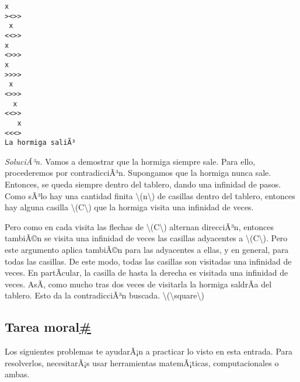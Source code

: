 \documentclass[
]{article}
\begin{document}
\begin{verbatim}
x   
><>>
 x  
<<>>
x   
<>>>
x   
>>>>
 x  
<>>>
  x 
<<>>
   x
<<<>
La hormiga saliÃ³
\end{verbatim}

\emph{SoluciÃ³n.} Vamos a demostrar que la hormiga siempre sale. Para
ello, procederemos por contradicciÃ³n. Supongamos que la hormiga nunca
sale. Entonces, se queda siempre dentro del tablero, dando una infinidad
de pasos. Como sÃ³lo hay una cantidad finita
{\textbackslash(n\textbackslash)} de casillas dentro del tablero,
entonces hay alguna casilla {\textbackslash(C\textbackslash)} que la
hormiga visita una infinidad de veces.

Pero como en cada visita las flechas de
{\textbackslash(C\textbackslash)} alternan direcciÃ³n, entonces tambiÃ©n
se visita una infinidad de veces las casillas adyacentes a
{\textbackslash(C\textbackslash)}. Pero este argumento aplica tambiÃ©n
para las adyacentes a ellas, y en general, para todas las casillas. De
este modo, todas las casillas son visitadas una infinidad de veces. En
partÃ­cular, la casilla de hasta la derecha es visitada una infinidad de
veces. AsÃ­, como mucho tras dos veces de visitarla la hormiga saldrÃ­a
del tablero. Esto da la contradicciÃ³n buscada.
{{\textbackslash(\textbackslash square\textbackslash)}}

\subsection{\texorpdfstring{Tarea
moral\hyperref[tarea-moral]{\#}}{Tarea moral\#}}\label{tarea-moral}

Los siguientes problemas te ayudarÃ¡n a practicar lo visto en esta
entrada. Para resolverlos, necesitarÃ¡s usar herramientas matemÃ¡ticas,
computacionales o ambas.
\end{document}
